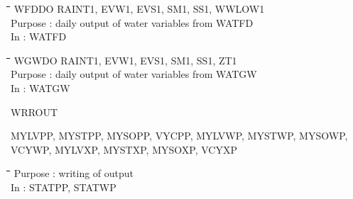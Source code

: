 \begin{tabbing}
\hspace{1.27cm}\=\hspace{1.27cm}\=\hspace{1.27cm}\=\hspace{1.27cm}\=%
\hspace{1.27cm}\=\hspace{1.27cm}\=\hspace{1.27cm}\=\hspace{1.27cm}\=%
\hspace{1.27cm}\=\hspace{1.27cm}\=\kill
 WFDDO\> \> RAINT1, EVW1, EVS1, SM1, SS1, WWLOW1\\
\>\> Purpose\> : daily output of water variables from WATFD\\
\>\> In\> : WATFD
\end{tabbing}

\nwln
\begin{tabbing}
\hspace{1.27cm}\=\hspace{1.27cm}\=\hspace{1.27cm}\=\hspace{1.27cm}\=%
\hspace{1.27cm}\=\hspace{1.27cm}\=\hspace{1.27cm}\=\hspace{1.27cm}\=%
\hspace{1.27cm}\=\hspace{1.27cm}\=\kill
WGWDO\> \> RAINT1, EVW1, EVS1, SM1, SS1, ZT1\\
\>\> Purpose\> : daily output of water variables from WATGW\\
\>\> In\> : WATGW
\end{tabbing}

\bigskip
WRROUT
\testlastline

\begin{indenting}{2.54cm}
MYLVPP, MYSTPP, MYSOPP, VYCPP, MYLVWP, MYSTWP, MYSOWP, VCYWP, MYLVXP,
MYSTXP, MYSOXP, VCYXP
\end{indenting}
\begin{tabbing}
\hspace{1.27cm}\=\hspace{1.27cm}\=\hspace{1.27cm}\=\hspace{1.27cm}\=%
\hspace{1.27cm}\=\hspace{1.27cm}\=\hspace{1.27cm}\=\hspace{1.27cm}\=%
\hspace{1.27cm}\=\hspace{1.27cm}\=\kill
\>\> Purpose\> : writing of output\\
\>\> In\> : STATPP, STATWP
\end{tabbing}

